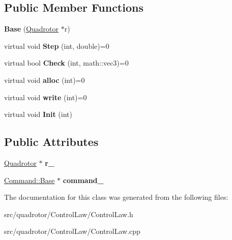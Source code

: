 \subsection*{\-Public \-Member \-Functions}
\begin{DoxyCompactItemize}
\item 
\hypertarget{classCL_1_1Base_ad8db38f548637316213cd109aed97792}{{\bfseries \-Base} (\hyperlink{classQuadrotor}{\-Quadrotor} $\ast$r)}\label{classCL_1_1Base_ad8db38f548637316213cd109aed97792}

\item 
\hypertarget{classCL_1_1Base_a08bb880fc7c5f5c81ee77eaa9570c32a}{virtual void {\bfseries \-Step} (int, double)=0}\label{classCL_1_1Base_a08bb880fc7c5f5c81ee77eaa9570c32a}

\item 
\hypertarget{classCL_1_1Base_a3de68eff20bc897fea32c758bff81d03}{virtual bool {\bfseries \-Check} (int, math\-::vec3)=0}\label{classCL_1_1Base_a3de68eff20bc897fea32c758bff81d03}

\item 
\hypertarget{classCL_1_1Base_ab4f3f33c7eb3869ca36490255600c3a5}{virtual void {\bfseries alloc} (int)=0}\label{classCL_1_1Base_ab4f3f33c7eb3869ca36490255600c3a5}

\item 
\hypertarget{classCL_1_1Base_ab23d401d25f004ee0e7ef20a591a6ba2}{virtual void {\bfseries write} (int)=0}\label{classCL_1_1Base_ab23d401d25f004ee0e7ef20a591a6ba2}

\item 
\hypertarget{classCL_1_1Base_acbc68636ede90524743ffb85dd41aa0c}{virtual void {\bfseries \-Init} (int)}\label{classCL_1_1Base_acbc68636ede90524743ffb85dd41aa0c}

\end{DoxyCompactItemize}
\subsection*{\-Public \-Attributes}
\begin{DoxyCompactItemize}
\item 
\hypertarget{classCL_1_1Base_ad96040f9fcd19572e9e73dbafc62f801}{\hyperlink{classQuadrotor}{\-Quadrotor} $\ast$ {\bfseries r\-\_\-}}\label{classCL_1_1Base_ad96040f9fcd19572e9e73dbafc62f801}

\item 
\hypertarget{classCL_1_1Base_aacd59a4cfd28c0bb1fbb468193cf8780}{\hyperlink{classCommand_1_1Base}{\-Command\-::\-Base} $\ast$ {\bfseries command\-\_\-}}\label{classCL_1_1Base_aacd59a4cfd28c0bb1fbb468193cf8780}

\end{DoxyCompactItemize}


\-The documentation for this class was generated from the following files\-:\begin{DoxyCompactItemize}
\item 
src/quadrotor/\-Control\-Law/\-Control\-Law.\-h\item 
src/quadrotor/\-Control\-Law/\-Control\-Law.\-cpp\end{DoxyCompactItemize}
